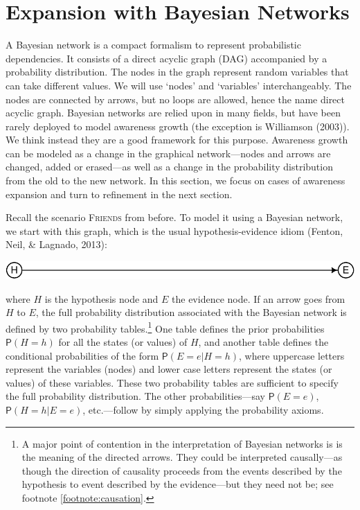 \documentclass[
  11pt,
  dvipsnames,enabledeprecatedfontcommands]{scrartcl}
\newcommand{\pr}[1]{\ensuremath{\mathsf{P}(#1)}}
\begin{document}
\hypertarget{expansion-with-bayesian-networks}{%
\section{Expansion with Bayesian
Networks}\label{expansion-with-bayesian-networks}}

A Bayesian network is a compact formalism to represent probabilistic
dependencies. It consists of a direct acyclic graph (DAG) accompanied by
a probability distribution. The nodes in the graph represent random
variables that can take different values. We will use `nodes' and
`variables' interchangeably. The nodes are connected by arrows, but no
loops are allowed, hence the name direct acyclic graph. Bayesian
networks are relied upon in many fields, but have been rarely deployed
to model awareness growth (the exception is Williamson (2003)). We think
instead they are a good framework for this purpose. Awareness growth can
be modeled as a change in the graphical network---nodes and arrows are
changed, added or erased---as well as a change in the probability
distribution from the old to the new network. In this section, we focus
on cases of awareness expansion and turn to refinement in the next
section.

Recall the scenario \textsc{Friends} from before. To model it using a
Bayesian network, we start with this graph, which is the usual
hypothesis-evidence idiom (Fenton, Neil, \& Lagnado, 2013):

\begin{center}\includegraphics[width=0.5\linewidth,height=0.5\textheight]{ReplyToSteeleStefansson5_files/figure-latex/heDAG-prel-1} \end{center}

\noindent where \(H\) is the hypothesis node and \(E\) the evidence
node. If an arrow goes from \(H\) to \(E\), the full probability
distribution associated with the Bayesian network is defined by two
probability tables.\footnote{A major point of contention in the
  interpretation of Bayesian networks is is the meaning of the directed
  arrows. They could be interpreted causally---as though the direction
  of causality proceeds from the events described by the hypothesis to
  event described by the evidence---but they need not be; see footnote
  \ref{footnote:causation}.} One table defines the prior probabilities
\(\pr{H=h}\) for all the states (or values) of \(H\), and another table
defines the conditional probabilities of the form
\(\pr{E=e \vert H=h}\), where uppercase letters represent the variables
(nodes) and lower case letters represent the states (or values) of these
variables. These two probability tables are sufficient to specify the
full probability distribution. The other probabilities---say \pr{E=e},
\pr{H=h \vert E=e}, etc.---follow by simply applying the probability
axioms.
\end{document}
